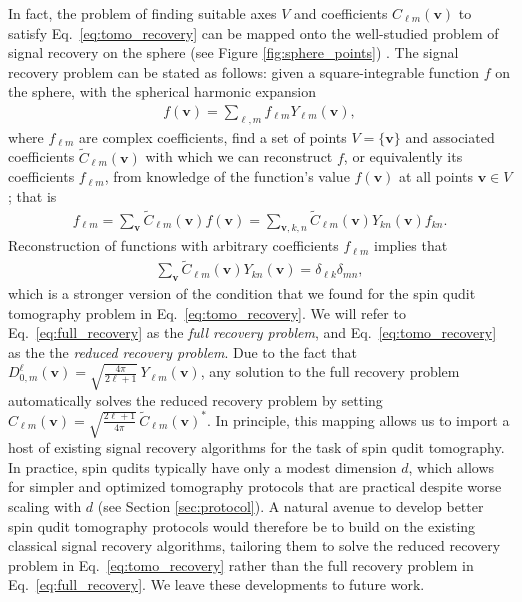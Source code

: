 \documentclass[nofootinbib,twocolumn]{revtex4-1}
\newcommand{\p}[1]{\left(#1\right)} %
\renewcommand{\set}[1]{\{#1\}} %
\begin{document}
In fact, the problem of finding suitable axes $V$ and coefficients $C_{\ell m}\p{\bm v}$ to satisfy Eq.~\eqref{eq:tomo_recovery} can be mapped onto the well-studied problem of signal recovery on the sphere (see Figure \ref{fig:sphere_points}) \cite{mcewen2011novel, rauhut2011sparse, alem2012sparse, khalid2014optimaldimensionality}.
The signal recovery problem can be stated as follows: given a square-integrable function $f$ on the sphere, with the spherical harmonic expansion
\begin{align}
  f\p{\bm v} = \sum_{\ell,m} f_{\ell m} Y_{\ell m}\p{\bm v},
\end{align}
where $f_{\ell m}$ are complex coefficients, find a set of points $V=\set{\bm v}$ and associated coefficients $\tilde C_{\ell m}\p{\bm v}$ with which we can reconstruct $f$, or equivalently its coefficients $f_{\ell m}$, from knowledge of the function's value $f\p{\bm v}$ at all points $\bm v\in V$; that is
\begin{align}
  f_{\ell m} = \sum_{\bm v} \tilde C_{\ell m}\p{\bm v} f\p{\bm v}
  = \sum_{\bm v,k,n} \tilde C_{\ell m}\p{\bm v} Y_{kn}\p{\bm v} f_{kn}.
\end{align}
Reconstruction of functions with arbitrary coefficients $f_{\ell m}$ implies that
\begin{align}
  \sum_{\bm v} \tilde C_{\ell m}\p{\bm v} Y_{kn}\p{\bm v}
  = \delta_{\ell k} \delta_{mn},
  \label{eq:full_recovery}
\end{align}
which is a stronger version of the condition that we found for the spin qudit tomography problem in Eq.~\eqref{eq:tomo_recovery}.
We will refer to Eq.~\eqref{eq:full_recovery} as the {\it full recovery problem}, and Eq.~\eqref{eq:tomo_recovery} as the the {\it reduced recovery problem}.
Due to the fact that $D^\ell_{0,m}\p{\bm v} = \sqrt{\frac{4\pi}{2\ell+1}}\, Y_{\ell m}\p{\bm v}$, any solution to the full recovery problem automatically solves the reduced recovery problem by setting $C_{\ell m}\p{\bm v} = \sqrt{\frac{2\ell+1}{4\pi}}\, \tilde C_{\ell m}\p{\bm v}^*$.
In principle, this mapping allows us to import a host of existing signal recovery algorithms \cite{mcewen2011novel, rauhut2011sparse, alem2012sparse, khalid2014optimaldimensionality} for the task of spin qudit tomography.
In practice, spin qudits typically have only a modest dimension $d$, which allows for simpler and optimized tomography protocols that are practical despite worse scaling with $d$ (see Section \ref{sec:protocol}).
A natural avenue to develop better spin qudit tomography protocols would therefore be to build on the existing classical signal recovery algorithms, tailoring them to solve the reduced recovery problem in Eq.~\eqref{eq:tomo_recovery} rather than the full recovery problem in Eq.~\eqref{eq:full_recovery}.
We leave these developments to future work.
\end{document}
